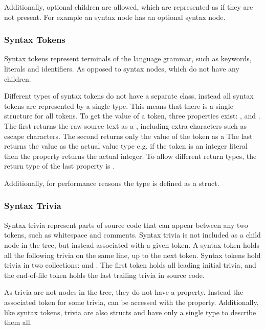 Additionally, optional children are allowed, which are represented as  if they are not present. For example an  syntax node has an optional  syntax node\cite[p. 7]{ng2012roslyn}.

\subsubsection{Syntax Tokens}
Syntax tokens represent terminals of the language grammar, such as keywords, literals and identifiers. As opposed to syntax nodes, which do not have any children.

Different types of syntax tokens do not have a separate class, instead all syntax tokens are represented by a single  type. This means that there is a single structure for all tokens. To get the value of a token, three properties exist: ,  and . The first returns the raw source text as a , including extra characters such as escape characters. The second returns only the value of the token as a  The last returns the value as the actual value type e.g. if the token is an integer literal then the property returns the actual integer. To allow different return types, the return type of the last property is \cite[p. 7-8]{ng2012roslyn}.

Additionally, for performance reasons the  type is defined as a struct\cite[p. 7]{ng2012roslyn}.

\subsubsection{Syntax Trivia}
Syntax trivia represent parts of source code that can appear between any two tokens, such as whitespace and comments. Syntax trivia is not included as a child node in the tree, but instead associated with a given token. A syntax token holds all the following trivia on the same line, up to the next token. Syntax tokens hold trivia in two collections:  and . The first token holds all leading initial trivia, and the end-of-file token holds the last trailing trivia in source code\cite[p. 8]{ng2012roslyn}.

As trivia are not nodes in the tree, they do not have a  property. Instead the associated token for some trivia, can be accessed with the  property. Additionally, like syntax tokens, trivia are also structs and have only a single  type to describe them all.

